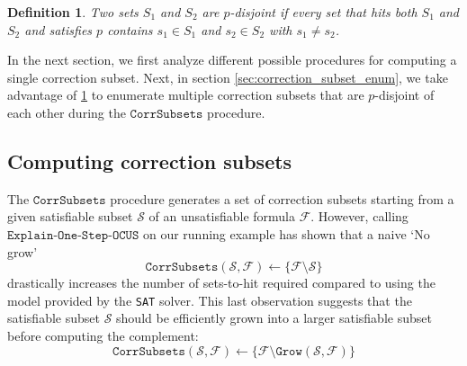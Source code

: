 \documentclass[twoside,11pt]{article}
\newcommand\m[1]{\mathcal{#1}}
\newtheorem{definition}[thm]{Definition}
\newcommand\comment[1]{\marginpar{\tiny #1}}
\renewcommand\comment[1]{#1}
\newcommand{\bart}[1]{{\comment{\color{OliveGreen}Bart: #1}}}
\newcommand\subsetT{\ensuremath{\m{S} }\xspace}
\newcommand\formula{\ensuremath{\m{F} }\xspace}
\newcommand\mm[1]{\ensuremath{#1}\xspace}
\newcommand\call[1]{\mm{\texttt{#1}}}
\newcommand\sat{\texttt{{SAT}}\xspace}
\newcommand\grow{\mm{\call{Grow}}}
\newcommand\corrsubsets{\mm{\call{CorrSubsets}}}
\newcommand\onestepo{\ensuremath{\call{Explain-One-Step-OCUS}}\xspace}
\begin{document}
\begin{definition}\label{prop:p-disjoint}
	Two sets $S_1$ and $S_2$ are $p$-disjoint if every set that hits both $S_1$ and $S_2$ and satisfies $p$ contains $s_1\in S_1$ and $s_2\in S_2$ with $s_1 \neq s_2$.
\end{definition}

In the next section, %
we first analyze different possible procedures for computing a single correction subset. Next, in section \ref{sec:correction_subset_enum}, we take advantage of \cref{prop:p-disjoint} to enumerate multiple correction subsets that are $p$-disjoint of each other during the \corrsubsets procedure.


\subsection{Computing correction subsets}\label{sec:computing-correction-subsets}

The \corrsubsets procedure generates a set of correction subsets starting from a given satisfiable subset $\subsetT$ of an unsatisfiable formula $\formula$. 
However, calling \onestepo on our running example has shown that a naive `No grow'
\begin{equation}\label{corrsubsets-no-grow}
	\corrsubsets(\subsetT, \formula) \gets \{\formula \setminus  \subsetT \}
\end{equation}
drastically increases the number of sets-to-hit required compared to using the model provided by the \sat solver. 
This last observation suggests that the satisfiable subset $\m{S}$ should be efficiently grown into a larger satisfiable subset before computing the complement:
\begin{equation}\label{corrsubsets-with-grow}
	\corrsubsets(\subsetT, \formula) \gets \{\formula \setminus  \grow(\subsetT, \formula) \}
\end{equation}
\end{document}
